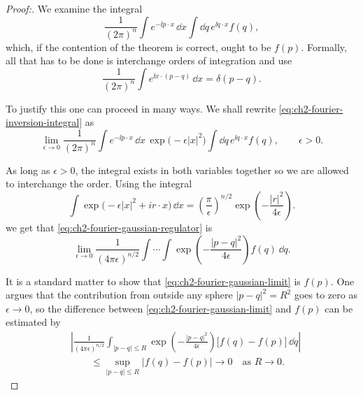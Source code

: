 \begin{proof}[Proof:]
We examine the integral
\begin{equation}
  \frac{1}{(2\pi)^n}\int e^{-\ii p\cdot x}\,\dd x
  \int \dd q\,e^{\ii q\cdot x}f(q),
  \tag{2-39}\label{eq:ch2-fourier-inversion-integral}
\end{equation}
which, if the contention of the theorem is correct, ought to be $f(p)$.
Formally, all that has to be done is interchange orders of integration and
use
\begin{equation}
  \frac{1}{(2\pi)^n}\int e^{\ii x\cdot(p-q)}\,\dd x=\delta(p-q) .
  \tag{2-40}\label{eq:ch2-fourier-delta}
\end{equation}

To justify this one can proceed in many ways.  We shall rewrite \eqref{eq:ch2-fourier-inversion-integral} as
\begin{equation}
  \lim_{\epsilon\to0}\frac{1}{(2\pi)^n}
  \int e^{-\ii p\cdot x}\,\dd x\,\exp\bigl(-\epsilon|x|^2\bigr)
  \int \dd q\,e^{\ii q\cdot x}f(q),\qquad \epsilon>0 .
  \tag{2-41}\label{eq:ch2-fourier-gaussian-regulator}
\end{equation}

As long as $\epsilon>0$, the integral exists in both variables together so
we are allowed to interchange the order.  Using the integral
\begin{equation}
  \int\exp\bigl(-\epsilon|x|^2+ir\cdot x\bigr)\,\dd x
  =\left(\frac{\pi}{\epsilon}\right)^{n/2}
  \exp\left(-\frac{|r|^2}{4\epsilon}\right) .
  \tag{2-42}\label{eq:ch2-gaussian-integral}
\end{equation}
we get that \eqref{eq:ch2-fourier-gaussian-regulator} is
\begin{equation}
  \lim_{\epsilon\to0}\frac{1}{(4\pi\epsilon)^{n/2}}
  \int\!\cdots\!\int
  \exp\left(-\frac{|p-q|^2}{4\epsilon}\right)f(q)\,\dd q .
  \tag{2-43}\label{eq:ch2-fourier-gaussian-limit}
\end{equation}

It is a standard matter to show that \eqref{eq:ch2-fourier-gaussian-limit} is $f(p)$.  One argues that the
contribution from outside any sphere $|p-q|^2=R^2$ goes to zero as
$\epsilon\to0$, so the difference between \eqref{eq:ch2-fourier-gaussian-limit} and $f(p)$ can be estimated
by
\begin{equation*}
\begin{aligned}
 &\left|
 \frac{1}{(4\pi\epsilon)^{n/2}}
 \int_{|p-q|\leq R}
 \exp\left(-\frac{|p-q|^2}{4\epsilon}\right)
 \bigl[f(q)-f(p)\bigr]\,\dd q
 \right| \\
 &\qquad\leq \sup_{|p-q|\leq R}|f(q)-f(p)|\longrightarrow 0
 \quad\text{as }R\longrightarrow0 .
\end{aligned}
\end{equation*}
\end{proof}

